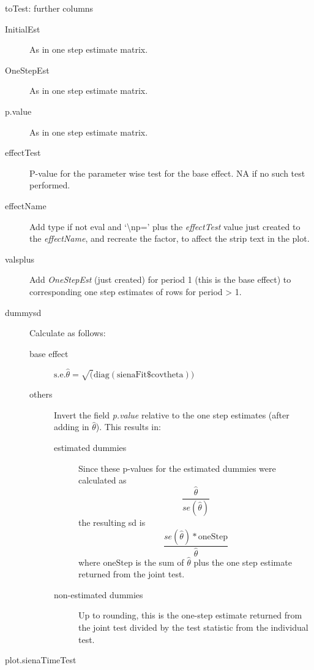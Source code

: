 \documentclass[12pt,a4paper]{article}
\makeatletter
\renewcommand{\=}{\,=\,}
\newcommand{\+}{\,+\,}
\newcommand{\nnm}[1]{\textsf{\small\textit{#1}}}
\renewcommand{\section}{\@startsection{section}{1}
                {0pt}{\baselineskip}{0.5\baselineskip}
                {\centering\sffamily} }
\renewcommand{\subsection}{\@startsection{subsection}{2}
                {0pt}{0.7\baselineskip}{0.3\baselineskip}
                {\sffamily} }
\makeatother
\begin{document}
\subsection{toTest: further columns}
\label{sec:extra}
\begin{description}
\item[InitialEst] As in one step estimate matrix.
\item[OneStepEst] As in one step estimate matrix.
\item[p.value] As in one step estimate matrix.
\item[effectTest] P-value for the parameter wise test for the base effect. NA if
  no such test performed.
\item[effectName] Add type if not eval and `\textbackslash np=' plus the
  \nnm{effectTest} value just created to the \nnm{effectName}, and recreate the
  factor, to affect the strip text in the plot.
\item[valsplus] Add \nnm{OneStepEst} (just created) for period 1 (this is the
  base effect) to corresponding one step estimates of rows for period > 1.
\item[dummysd] Calculate as follows:
\begin{description}
\item[base effect] $ \mathrm{s.e. }\hat{\theta} =
\sqrt(\mathrm{diag(sienaFit\$covtheta))}$
\item[others] Invert the field \nnm{p.value} relative to the one step estimates
  (after adding in $\hat{\theta}$).
This results in:
\begin{description}
\item[estimated dummies]
Since these p-values for the estimated dummies were calculated as
$$
\frac{\hat{\theta}}{se (\hat{\theta})}
$$
the resulting sd is
$$
\frac{se (\hat{\theta}) * \mathrm{oneStep}}{\hat{\theta}}
$$
where $\mathrm{oneStep}$ is the sum of $\hat{\theta}$ plus the one step
estimate returned from the joint test.
\item[non-estimated dummies]  Up to rounding, this is the one-step estimate
  returned from the joint test divided by the test statistic from the individual
  test.
\end{description}
\end{description}
\end{description}
\section{plot.sienaTimeTest}
\end{document}
